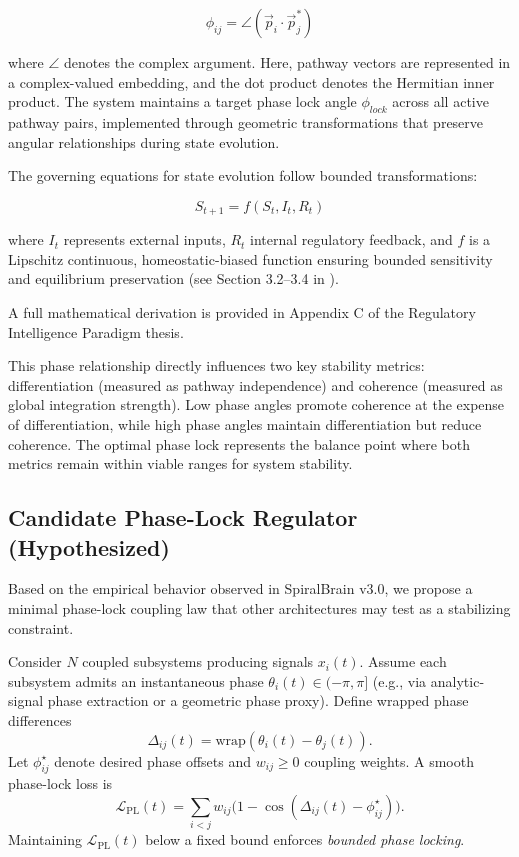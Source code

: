 \documentclass[12pt,a4paper]{report}
\begin{document}
\[\phi_{ij} = \angle(\vec{p}_i \cdot \vec{p}_j^*)\]

where $\angle$ denotes the complex argument. Here, pathway vectors are represented in a complex-valued embedding, and the dot product denotes the Hermitian inner product. The system maintains a target phase lock angle $\phi_{lock}$ across all active pathway pairs, implemented through geometric transformations that preserve angular relationships during state evolution.

The governing equations for state evolution follow bounded transformations:

\[S_{t+1} = f(S_t, I_t, R_t)\]

where $I_t$ represents external inputs, $R_t$ internal regulatory feedback, and $f$ is a Lipschitz continuous, homeostatic-biased function ensuring bounded sensitivity and equilibrium preservation (see Section 3.2–3.4 in \cite{Cragin2026Thesis}).

A full mathematical derivation is provided in Appendix C of the Regulatory Intelligence Paradigm thesis.

This phase relationship directly influences two key stability metrics: differentiation (measured as pathway independence) and coherence (measured as global integration strength). Low phase angles promote coherence at the expense of differentiation, while high phase angles maintain differentiation but reduce coherence. The optimal phase lock represents the balance point where both metrics remain within viable ranges for system stability.

\subsection{Candidate Phase-Lock Regulator (Hypothesized)}

Based on the empirical behavior observed in SpiralBrain v3.0, we propose a minimal
phase-lock coupling law that other architectures may test as a stabilizing constraint.

Consider $N$ coupled subsystems producing signals $x_i(t)$. Assume each subsystem admits
an instantaneous phase $\theta_i(t)\in(-\pi,\pi]$ (e.g., via analytic-signal phase extraction
or a geometric phase proxy). Define wrapped phase differences
\[
\Delta_{ij}(t)=\mathrm{wrap}(\theta_i(t)-\theta_j(t)).
\]
Let $\phi_{ij}^\star$ denote desired phase offsets and $w_{ij}\ge 0$ coupling weights.
A smooth phase-lock loss is
\[
\mathcal{L}_{\mathrm{PL}}(t)=\sum_{i<j} w_{ij}\Big(1-\cos(\Delta_{ij}(t)-\phi^\star_{ij})\Big).
\]
Maintaining $\mathcal{L}_{\mathrm{PL}}(t)$ below a fixed bound enforces \emph{bounded phase locking}.
\end{document}
